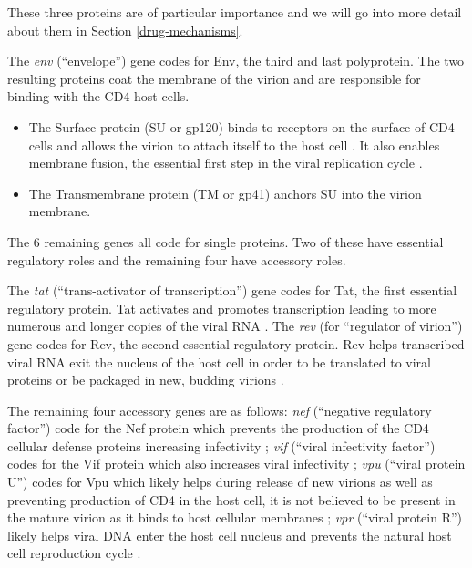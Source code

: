 \documentclass[
  11pt,
  twoside,
  BCOR=10mm,
  listof=totoc]{scrbook}
\begin{document}
These three proteins are of particular importance and we will go into more detail about them in Section \ref{drug-mechanisms}.

The \emph{env} (``envelope'') gene codes for Env, the third and last polyprotein. The two resulting proteins coat the membrane of the virion and are responsible for binding with the CD4 host cells.

\begin{itemize}
\item
  The Surface protein (SU or gp120) binds to receptors on the surface of CD4 cells and allows the virion to attach itself to the host cell \autocite{bourHumanImmunodeficiencyVirus1995}. It also enables membrane fusion, the essential first step in the viral replication cycle \autocite{hernandezViruscellCellcellFusion1996}.
\item
  The Transmembrane protein (TM or gp41) anchors SU into the virion membrane.
\end{itemize}

The 6 remaining genes all code for single proteins. Two of these have essential regulatory roles and the remaining four have accessory roles.

The \emph{tat} (``trans-activator of transcription'') gene codes for Tat, the first essential regulatory protein. Tat activates and promotes transcription leading to more numerous and longer copies of the viral RNA \autocite{jonesControlRnaInitiation1994}. The \emph{rev} (for ``regulator of virion'') gene codes for Rev, the second essential regulatory protein. Rev helps transcribed viral RNA exit the nucleus of the host cell in order to be translated to viral proteins or be packaged in new, budding virions \autocite{hopeViralRNAExport1997}.

The remaining four accessory genes are as follows: \emph{nef} (``negative regulatory factor'') code for the Nef protein which prevents the production of the CD4 cellular defense proteins increasing infectivity \autocite{mangasarianMultifacetedRoleHIV1997}; \emph{vif} (``viral infectivity factor'') codes for the Vif protein which also increases viral infectivity \autocite{cohenRoleAuxiliaryProteins1996}; \emph{vpu} (``viral protein U'') codes for Vpu which likely helps during release of new virions \autocite{lambVpuVprHuman1997,cohenRoleAuxiliaryProteins1996} as well as preventing production of CD4 in the host cell, it is not believed to be present in the mature virion as it binds to host cellular membranes \autocite{khanRoleViralProtein2021}; \emph{vpr} (``viral protein R'') likely helps viral DNA enter the host cell nucleus and prevents the natural host cell reproduction cycle \autocite{emermanHIV1VprCell1996}.
\end{document}
